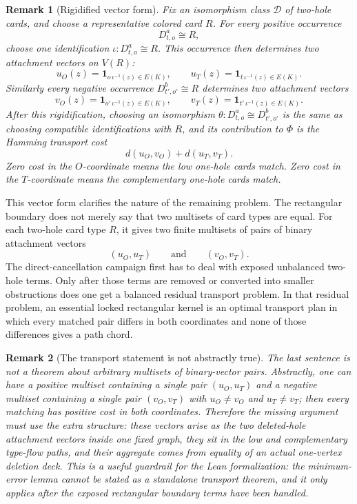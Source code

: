 \documentclass[11pt]{article}
\newtheorem{remark}{Remark}
\newcommand{\one}{\mathbf{1}}
\begin{document}
\begin{remark}[Rigidified vector form]
Fix an isomorphism class \(\mathcal D\) of two-hole cards, and choose a
representative colored card \(R\).  For every positive occurrence
\[
  D_{t,o}^a\cong R,
\]
choose one identification \(\iota:D_{t,o}^a\cong R\).  This occurrence then
determines two attachment vectors on \(V(R)\):
\[
  u_O(z)=\one_{o\,\iota^{-1}(z)\in E(K)},
  \qquad
  u_T(z)=\one_{t\,\iota^{-1}(z)\in E(K)}.
\]
Similarly every negative occurrence \(D_{t',o'}^b\cong R\) determines two
attachment vectors
\[
  v_O(z)=\one_{o'\,\iota^{-1}(z)\in E(K)},
  \qquad
  v_T(z)=\one_{t'\,\iota^{-1}(z)\in E(K)}.
\]
After this rigidification, choosing an isomorphism
\(\theta:D_{t,o}^a\cong D_{t',o'}^b\) is the same as choosing compatible
identifications with \(R\), and its contribution to \(\Phi\) is the Hamming
transport cost
\[
  d(u_O,v_O)+d(u_T,v_T).
\]
Zero cost in the \(O\)-coordinate means the low one-hole cards match.  Zero
cost in the \(T\)-coordinate means the complementary one-hole cards match.
\end{remark}

This vector form clarifies the nature of the remaining problem.  The
rectangular boundary does not merely say that two multisets of card types are
equal.  For each two-hole card type \(R\), it gives two finite multisets of
pairs of binary attachment vectors
\[
  (u_O,u_T)
  \qquad\text{and}\qquad
  (v_O,v_T).
\]
The direct-cancellation campaign first has to deal with exposed unbalanced
two-hole terms.  Only after those terms are removed or converted into smaller
obstructions does one get a balanced residual transport problem.  In that
residual problem, an essential locked rectangular kernel is an optimal
transport plan in which every matched pair differs in both coordinates and
none of those differences gives a path chord.

\begin{remark}[The transport statement is not abstractly true]
The last sentence is not a theorem about arbitrary multisets of binary-vector
pairs.  Abstractly, one can have a positive multiset containing a single pair
\((u_O,u_T)\) and a negative multiset containing a single pair
\((v_O,v_T)\) with \(u_O\neq v_O\) and \(u_T\neq v_T\); then every matching
has positive cost in both coordinates.  Therefore the missing argument must
use the extra structure: these vectors arise as the two deleted-hole
attachment vectors inside one fixed graph, they sit in the low and
complementary type-flow paths, and their aggregate comes from equality of an
actual one-vertex deletion deck.  This is a useful guardrail for the Lean
formalization: the minimum-error lemma cannot be stated as a standalone
transport theorem, and it only applies after the exposed rectangular boundary
terms have been handled.
\end{remark}
\end{document}
